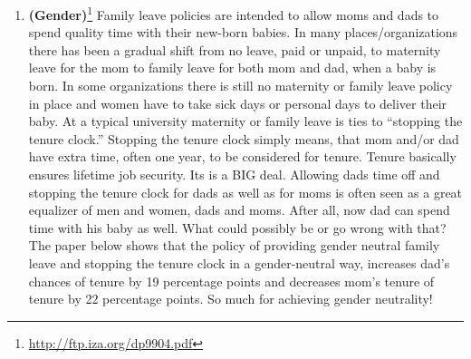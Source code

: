 \documentclass[
]{book}
\providecommand{\tightlist}{%
  \setlength{\itemsep}{0pt}\setlength{\parskip}{0pt}}
\begin{document}
\begin{enumerate}
\def\labelenumi{\arabic{enumi}.}
\setcounter{enumi}{5}
\tightlist
\item
  \textbf{(Gender)}\footnote{\url{http://ftp.iza.org/dp9904.pdf}} Family leave policies are intended to allow moms and dads to spend quality time with their new-born babies. In many places/organizations there has been a gradual shift from no leave, paid or unpaid, to maternity leave for the mom to family leave for both mom and dad, when a baby is born. In some organizations there is still no maternity or family leave policy in place and women have to take sick days or personal days to deliver their baby. At a typical university maternity or family leave is ties to ``stopping the tenure clock.'' Stopping the tenure clock simply means, that mom and/or dad have extra time, often one year, to be considered for tenure. Tenure basically ensures lifetime job security. Its is a BIG deal.
  Allowing dads time off and stopping the tenure clock for dads as well as for moms is often seen as a great equalizer of men and women, dads and moms. After all, now dad can spend time with his baby as well. What could possibly be or go wrong with that?
  The paper below shows that the policy of providing gender neutral family leave and stopping the tenure clock in a gender-neutral way, increases dad's chances of tenure by 19 percentage points and decreases mom's tenure of tenure by 22 percentage points.
  So much for achieving gender neutrality!
\end{enumerate}
\end{document}
